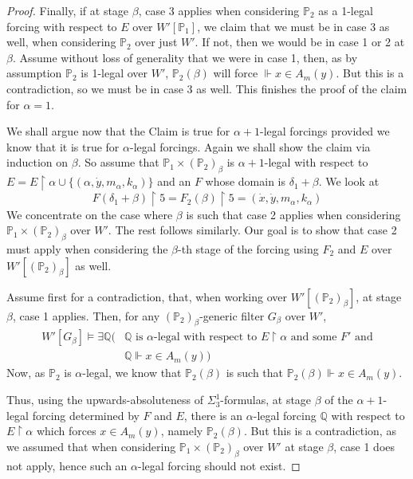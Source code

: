 \documentclass[a4paper,11pt]{article}
\newcommand{\forceP}{\mathbb{P}}
\newcommand{\forceQ}{\mathbb{Q}}
\begin{document}
\begin{proof}
Finally, if at stage $\beta$, case 3 applies when considering $\forceP_2$ as a 1-legal forcing with respect to $E$ over $W'[\forceP_1]$, we claim that we must be in case 3 as well, when considering $\forceP_2$ over just $W'$.
If not, then we would be in case 1 or 2 at $\beta$. Assume without loss of generality that we were in case 1, then, as by assumption $\forceP_2$ is 1-legal over $W'$, $\forceP_2(\beta)$ will force $\Vdash x \in A_m(y)$. But this is a contradiction, so we must be in case 3 as well.
This finishes the proof of the claim for $\alpha=1$.


\medskip

We shall argue now that the Claim is true for $\alpha+1$-legal forcings provided we know that it is true for $\alpha$-legal forcings.
Again we shall show the claim via induction on $\beta$. So assume that $\forceP_1 \times (\forceP_2)_{\beta}$ is $\alpha+1$-legal with respect to $E=E \upharpoonright \alpha \cup \{(\alpha, \dot{y},m_{\alpha},k_{\alpha})\}$ and an $F$ whose domain is $\delta_1 +\beta$. 
We look at
\[F(\delta_1+ \beta) \upharpoonright 5=F_2(\beta) \upharpoonright 5=  (\dot{x},\dot{y},m_{\alpha},k_{\alpha})\]
We concentrate on the case where $\beta$ is such that case 2 applies when considering $\forceP_1 \times (\forceP_2)_{\beta}$ over $W'$. The rest follows similarly. Our goal is to show that case 2 must apply when considering the $\beta$-th stage of the forcing using $F_2$ and $E$ over $W'[(\forceP_2)_{\beta}]$ as well.

Assume first for a contradiction, that, when working over $W'[(\forceP_2)_{\beta}]$, at stage $\beta$, case 1 applies.
Then, for any $(\forceP_2)_{\beta}$-generic filter $ G_{\beta}$ over $W'$, 
\begin{align*}
W'[G_{\beta}] \models \exists \forceQ (&\forceQ \text{ is $\alpha$-legal with respect to $E \upharpoonright \alpha$ and some $F'$ and} \\ & \forceQ \Vdash x \in A_m(y))
\end{align*}
Now, as $\forceP_2$ is $\alpha$-legal, we know that $\forceP_2(\beta)$ is such that $\forceP_2(\beta) \Vdash x \in A_m(y)$.

Thus, using the upwards-absoluteness of $\Sigma^1_3$-formulas, at stage $\beta$ of the $\alpha+1$-legal forcing determined by $F$ and $E$, there is an $\alpha$-legal forcing $\forceQ$ with respect to $E \upharpoonright \alpha$ which forces $x \in A_m(y)$, namely $\forceP_2(\beta)$. But this is  a contradiction, as we assumed that when considering $\forceP_1 \times (\forceP_2)_{\beta}$ over $W'$ at stage $\beta$, case 1 does not apply, hence such an $\alpha$-legal forcing should not exist.


\end{proof}
\end{document}
